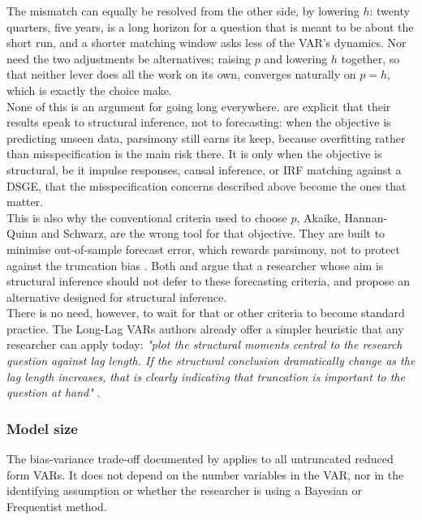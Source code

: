 \documentclass[12pt, a4paper]{article}
\begin{document}
The mismatch can equally be resolved from the other side, by lowering $h$: twenty quarters, five years, is a long horizon for a question that is meant to be about
the short run, and a shorter matching window asks less of the VAR's dynamics. Nor need the two
adjustments be alternatives; raising $p$ and lowering $h$ together, so that neither lever does
all the work on its own, converges naturally on $p=h$, which is exactly the choice
\citet{Antolin-Diaz_Surico2025} make.
\\

None of this is an argument for going long everywhere. \citet{Long_Lag2025} are explicit that
their results speak to structural inference, not to forecasting: when the objective is
predicting unseen data, parsimony still earns its keep, because overfitting rather than
misspecification is the main risk there. It is only when the objective is structural, be it
impulse responses, causal inference, or IRF matching against a DSGE, that the misspecification
concerns described above become the ones that matter.
\\

This is also why the conventional criteria used to choose $p$, Akaike, Hannan-Quinn and
Schwarz, are the wrong tool for that objective. They are built to minimise out-of-sample
forecast error, which rewards parsimony, not to protect against the truncation bias \citep{Humble_VARs_2026,Baumeister2025}. Both \citet{Baumeister2025}
and \citet{Long_Lag2025} argue that a researcher whose aim is structural inference should not
defer to these forecasting criteria, and \citet{GonzalezCasasus_Schorfheide2025} propose an
alternative designed for structural inference.
\\

There is no need, however, to wait for that or other criteria to become standard practice.
The Long-Lag VARs authors already offer a simpler heuristic that any researcher can apply today:
\textit{"plot the structural moments central to the research question against lag length. If
the structural conclusion dramatically change as the lag length increases, that is clearly
indicating that truncation is important to the question at hand"} \citep[p.~12]{Long_Lag2025}.

\subsubsection*{Model size}
The bias-variance trade-off documented by \citet{Long_Lag2025} applies to all untruncated reduced form VARs.
It does not depend on the number variables in the VAR, nor in the identifying assumption or whether the researcher 
is using a Bayesian or Frequentist method.
\end{document}
